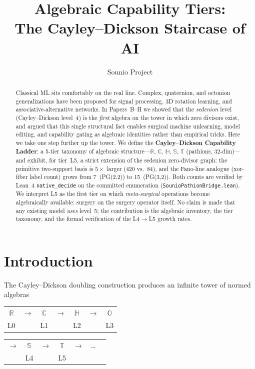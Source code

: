 \documentclass{article}
\title{Algebraic Capability Tiers:\\
       The Cayley--Dickson Staircase of AI}
\author{Sounio Project}
\begin{document}
\maketitle

\begin{abstract}
Classical ML sits comfortably on the real line.  Complex, quaternion,
and octonion generalizations have been proposed for signal
processing, 3D rotation learning, and associative-alternative
networks.  In Papers~B--H we showed that the \emph{sedenion} level
(Cayley--Dickson level~4) is the \emph{first} algebra on the tower
in which zero divisors exist, and argued that this single structural
fact enables surgical machine unlearning, model editing, and
capability gating as algebraic identities rather than empirical
tricks.  Here we take one step further up the tower.  We define the
\textbf{Cayley--Dickson Capability Ladder}: a 5-tier taxonomy of
algebraic structure---$\mathbb R$, $\mathbb C$, $\mathbb H$,
$\mathbb S$, $\mathbb T$ (pathions, 32-dim)---and exhibit, for
tier~L5, a strict extension of the sedenion zero-divisor graph:
the primitive two-support basis is $5\times$ larger (420 vs.\ 84),
and the Fano-line analogue (xor-fiber label count) grows from
7~(PG(2,2)) to 15~(PG(3,2)).  Both counts are verified by Lean~4
\texttt{native\_decide} on the committed enumeration
(\texttt{SounioPathionBridge.lean}).  We interpret L5 as the
first tier on which \emph{meta-surgical} operations become
algebraically available: surgery on the surgery operator itself.
No claim is made that any existing model \emph{uses} level~5; the
contribution is the algebraic inventory, the tier taxonomy, and the
formal verification of the L4$\to$L5 growth rates.
\end{abstract}

\section{Introduction}

The Cayley--Dickson doubling construction produces an infinite
tower of normed algebras

\begin{center}
  \begin{tabular}{ccccccc}
  $\mathbb R$ &$\to$& $\mathbb C$ &$\to$& $\mathbb H$ &$\to$& $\mathbb O$ \\
   L0 & & L1 & & L2 & & L3
  \end{tabular}
  \vspace{-0.15em}
  \begin{tabular}{ccccccc}
  $\to$& $\mathbb S$ &$\to$& $\mathbb T$ &$\to$& \ldots \\
       & L4 & & L5
  \end{tabular}
\end{center}
\end{document}
